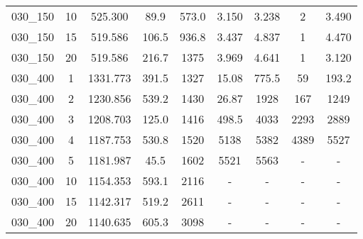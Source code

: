 \documentclass[10pt]{article}
\begin{document}
\begin{table}[h]
\begin{tabular}{ccc|cc|cc|cc}
{030\_150} & {10} & {525.300} & {89.9} & {573.0} & {3.150} & {3.238} & {2} & {3.490}\tabularnewline
{030\_150} & {15} & {519.586} & {106.5} & {936.8} & {3.437} & {4.837} & {1} & {4.470}\tabularnewline
{030\_150} & {20} & {519.586} & {216.7} & {1375} & {3.969} & {4.641} & {1} & {3.120 }\tabularnewline
\hline 
{030\_400} & {1} & {1331.773} & {391.5} & {1327} & {15.08} & {775.5} & {59} & {193.2}\tabularnewline
{030\_400} & {2} & {1230.856} & {539.2} & {1430} & {26.87} & {1928} & {167} & {1249}\tabularnewline
{030\_400} & {3} & {1208.703} & {125.0} & {1416} & {498.5} & {4033} & {2293} & {2889}\tabularnewline
{030\_400} & {4} & {1187.753} & {530.8} & {1520} & {5138} & {5382} & {4389} & {5527}\tabularnewline
{030\_400} & {5} & {1181.987} & {45.5} & {1602} & {5521} & {5563} & {-} & {-}\tabularnewline
{030\_400} & {10} & {1154.353} & {593.1} & {2116} & {-} & {-} & {-} & {-}\tabularnewline
{030\_400} & {15} & {1142.317 } & {519.2} & {2611} & {-} & {-} & {-} & {-}\tabularnewline
{030\_400} & {20} & {1140.635 } & {605.3} & {3098} & {-} & {-} & {-} & {-}\tabularnewline
\hline 
\end{tabular}
\end{table}
\end{document}
